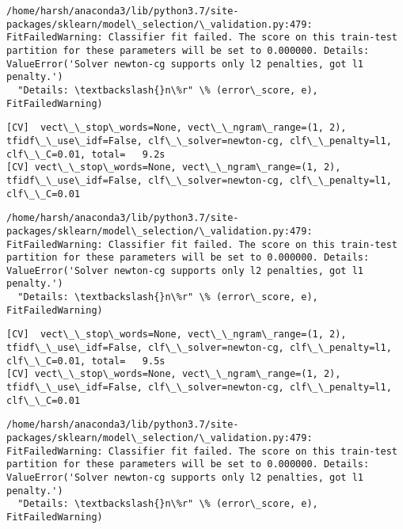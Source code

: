 \documentclass[11pt]{article}
\begin{document}
    \begin{Verbatim}[commandchars=\\\{\}]
/home/harsh/anaconda3/lib/python3.7/site-packages/sklearn/model\_selection/\_validation.py:479: FitFailedWarning: Classifier fit failed. The score on this train-test partition for these parameters will be set to 0.000000. Details: 
ValueError('Solver newton-cg supports only l2 penalties, got l1 penalty.')
  "Details: \textbackslash{}n\%r" \% (error\_score, e), FitFailedWarning)

    \end{Verbatim}

    \begin{Verbatim}[commandchars=\\\{\}]
[CV]  vect\_\_stop\_words=None, vect\_\_ngram\_range=(1, 2), tfidf\_\_use\_idf=False, clf\_\_solver=newton-cg, clf\_\_penalty=l1, clf\_\_C=0.01, total=   9.2s
[CV] vect\_\_stop\_words=None, vect\_\_ngram\_range=(1, 2), tfidf\_\_use\_idf=False, clf\_\_solver=newton-cg, clf\_\_penalty=l1, clf\_\_C=0.01 

    \end{Verbatim}

    \begin{Verbatim}[commandchars=\\\{\}]
/home/harsh/anaconda3/lib/python3.7/site-packages/sklearn/model\_selection/\_validation.py:479: FitFailedWarning: Classifier fit failed. The score on this train-test partition for these parameters will be set to 0.000000. Details: 
ValueError('Solver newton-cg supports only l2 penalties, got l1 penalty.')
  "Details: \textbackslash{}n\%r" \% (error\_score, e), FitFailedWarning)

    \end{Verbatim}

    \begin{Verbatim}[commandchars=\\\{\}]
[CV]  vect\_\_stop\_words=None, vect\_\_ngram\_range=(1, 2), tfidf\_\_use\_idf=False, clf\_\_solver=newton-cg, clf\_\_penalty=l1, clf\_\_C=0.01, total=   9.5s
[CV] vect\_\_stop\_words=None, vect\_\_ngram\_range=(1, 2), tfidf\_\_use\_idf=False, clf\_\_solver=newton-cg, clf\_\_penalty=l1, clf\_\_C=0.01 

    \end{Verbatim}

    \begin{Verbatim}[commandchars=\\\{\}]
/home/harsh/anaconda3/lib/python3.7/site-packages/sklearn/model\_selection/\_validation.py:479: FitFailedWarning: Classifier fit failed. The score on this train-test partition for these parameters will be set to 0.000000. Details: 
ValueError('Solver newton-cg supports only l2 penalties, got l1 penalty.')
  "Details: \textbackslash{}n\%r" \% (error\_score, e), FitFailedWarning)

    \end{Verbatim}
\end{document}

